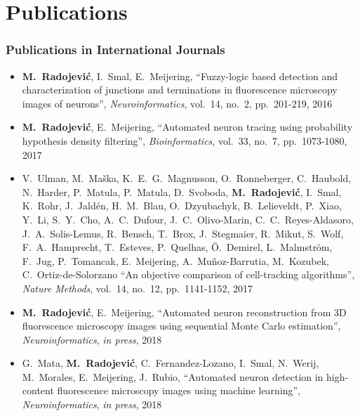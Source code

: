 %
%

\noquote
\orgchpos
\chapter*{Publications}
\label{publications}

\small
\normalsize

\subsection*{Publications in International Journals}
\vspace{1ex}
\begin{itemize}
	\item \textbf{M.~Radojevi\'{c}}, I.~Smal, E.~Meijering, ``Fuzzy-logic based detection and characterization of junctions and terminations in fluorescence microscopy images of neurons'', \emph{Neuroinformatics}, vol.~14, no.~2, pp.~201-219, 2016
	
	\item \textbf{M.~Radojevi\'{c}}, E.~Meijering, ``Automated neuron tracing using probability hypothesis density filtering'', \emph{Bioinformatics}, vol.~33, no.~7, pp.~1073-1080, 2017
	
	\item V.~Ulman, M.~Ma\v{s}ka, K.~E.~G.~Magnusson, O.~Ronneberger, C.~Haubold, N.~Harder, P.~Matula, P.~Matula, D.~Svoboda, \textbf{M.~Radojevi\'{c}}, I.~Smal, K.~Rohr, J.~Jald\'{e}n, H.~M.~Blau, O.~Dzyubachyk, B.~Lelieveldt, P.~Xiao, Y.~Li, S.~Y.~Cho, A.~C.~Dufour,	J.~C.~Olivo-Marin, C.~C.~Reyes-Aldasoro, J.~A.~Solis-Lemus, R.~Bensch, T.~Brox, J.~Stegmaier, R.~Mikut, S.~Wolf,	F.~A.~Hamprecht, T.~Esteves, P.~Quelhas, \"{O}.~Demirel, L.~Malmstr\"{o}m, F.~Jug, P.~Tomancak, E.~Meijering, A.~Mu\~{n}oz-Barrutia, M.~Kozubek, C.~Ortiz-de-Solorzano ``An objective comparison of cell-tracking algorithms'', \emph{Nature Methods}, vol.~14, no.~12, pp.~1141-1152, 2017
	
	\item \textbf{M.~Radojevi\'{c}}, E.~Meijering, ``Automated neuron reconstruction from 3D fluorescence microscopy images using sequential Monte Carlo estimation'', \emph{Neuroinformatics}, \emph{in press}, 2018%
	
	\item G.~Mata, \textbf{M.~Radojevi\'{c}}, C.~Fernandez-Lozano, I.~Smal, N.~Werij, M.~Morales, E.~Meijering, J.~Rubio, ``Automated neuron detection in high-content fluorescence microscopy images using machine learning'', \emph{Neuroinformatics}, \emph{in press}, 2018%
\end{itemize}

